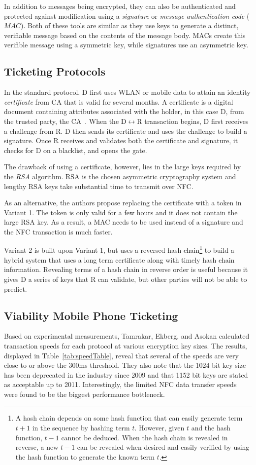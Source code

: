\documentclass{sig-alternate}
\begin{document}
In addition to messages being encrypted, they can also be authenticated and protected against modification using a \textit{signature} or \textit{message authentication code} ($MAC$). Both of these tools are similar as they use keys to generate a distinct, verifiable message based on the contents of the message body. MACs create this verifible message using a symmetric key, while signatures use an asymmetric key.~\cite{crypto}

\subsection{Ticketing Protocols}
In the standard protocol, D first uses WLAN or mobile data to attain an identity \textit{certificate} from CA that is valid for several months. A certificate is a digital document containing attributes associated with the holder, in this case D, from the trusted party, the CA~\cite{crypto}. When the D$\leftrightarrow$R transaction begins, D first receives a challenge from R.  D then sends its certificate and uses the challenge to build a signature. Once R receives and validates both the certificate and signature, it checks for D on a blacklist, and opens the gate.

The drawback of using a certificate, however, lies in the large keys required by the \textit{RSA} algorithm. RSA is the chosen asymmetric cryptography system and lengthy RSA keys take substantial time to transmit over NFC.

As an alternative, the authors propose replacing the certificate with a token in Variant 1. The token is only valid for a few hours and it does not contain the large RSA key. As a result, a MAC needs to be used instead of a signature and the NFC transaction is much faster.

Variant 2 is built upon Variant 1, but uses a reversed hash chain\footnote{
A hash chain depends on some hash function that can easily generate term $t+1$ in the sequence by hashing term $t$. However, given $t$ and the hash function, $t-1$ cannot be deduced. When the hash chain is revealed in reverse, a new $t-1$ can be revealed when desired and easily verified by using the hash function to generate the known term $t$.
} to build a hybrid system that uses a long term certificate along with timely hash chain information. Revealing terms of a hash chain in reverse order is useful because it gives D a series of keys that R can validate, but other parties will not be able to predict.

\subsection{Viability Mobile Phone Ticketing}
Based on experimental measurements, Tamrakar, Ekberg, and Asokan calculated transaction speeds for each protocol at various encryption key sizes. The results, displayed in Table~\ref{tab:speedTable}, reveal that several of the speeds are very close to or above the 300ms threshold. They also note that the 1024 bit key size has been deprecated in the industry  since 2009 and that 1152 bit keys are stated as acceptable up to 2011. Interestingly, the limited NFC data transfer speeds were found to be the biggest performance bottleneck.
\end{document}
